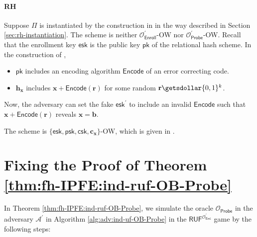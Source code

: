 \paragraph{RH}

Suppose $\Pi$ is instantiated by the construction in \cite{cryptoeprint:2014/394} in the way described in Section \ref{sec:rh-instantiation}. The scheme is neither $\mathcal{O}_{\textsf{Enroll}}^\prime$-OW nor $\mathcal{O}_{\textsf{Probe}}^\prime$-OW. Recall that the enrollment key $\textsf{esk}$ is the public key $\textsf{pk}$ of the relational hash scheme. In the construction of \cite{cryptoeprint:2014/394},
\begin{itemize}
	\item $\textsf{pk}$ includes an encoding algorithm $\textsf{Encode}$ of an error correcting code.
	\item $\mathbf{h_x}$ includes $\mathbf{x} + \textsf{Encode}(\mathbf{r})$ for some random $\mathbf{r} \getsdollar \{0,1\}^k$.
\end{itemize}
Now, the adversary can set the fake $\textsf{esk}^\prime$ to include an invalid $\textsf{Encode}$ such that $\mathbf{x} + \textsf{Encode}(\mathbf{r})$ reveals $\mathbf{x} = \mathbf{b}$. 

The scheme is $\{ \textsf{esk}, \textsf{psk}, \textsf{csk}, \mathbf{c_x} \}$-OW, which is given in \cite[Theorem 4]{cryptoeprint:2014/394}.


\newpage


\section{Fixing the Proof of Theorem \ref{thm:fh-IPFE:ind-ruf-OB-Probe}}
\label{sec:fixing-proof-thm-OB-Probe}

In Theorem \ref{thm:fh-IPFE:ind-ruf-OB-Probe}, we simulate the oracle $\mathcal{O}_{\textsf{Probe}}$ in the adversary $\mathcal{A}^\prime$ in Algorithm \ref{alg:adv:ind-uf-OB-Probe} in the $\textsf{RUF}^{ \mathcal{O}^\prime_{\textsf{Enc}} }$ game by the following steps:

